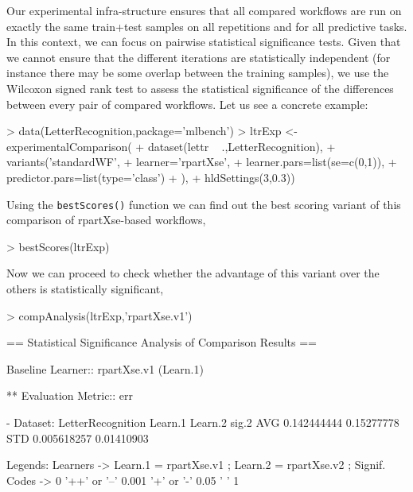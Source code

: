 \documentclass[10pt,a4paper]{article}
\begin{document}
Our experimental infra-structure ensures that all compared workflows
are run on exactly the same train+test samples on all repetitions and
for all predictive tasks. In this context, we can focus on pairwise
statistical significance tests. Given that we cannot ensure that the
different iterations are statistically independent (for instance there
may be some overlap between the training samples), we use the Wilcoxon
signed rank test to assess the statistical significance of the
differences between every pair of compared workflows. Let us see a
concrete example:


\begin{Schunk}
\begin{Sinput}
> data(LetterRecognition,package='mlbench')
> ltrExp <- experimentalComparison(
+   dataset(lettr ~ .,LetterRecognition),
+   variants('standardWF',
+            learner='rpartXse',
+            learner.pars=list(se=c(0,1)),
+            predictor.pars=list(type='class')
+            ),
+   hldSettings(3,0.3))
\end{Sinput}
\end{Schunk}

Using the \texttt{bestScores()} function we can find out the best
scoring variant of this comparison of rpartXse-based workflows,

\begin{Schunk}
\begin{Sinput}
> bestScores(ltrExp)
\end{Sinput}
\end{Schunk}

Now we can proceed to check whether the advantage of this variant over
the others is statistically significant,

\begin{Schunk}
\begin{Sinput}
> compAnalysis(ltrExp,'rpartXse.v1')
\end{Sinput}
\begin{Soutput}
== Statistical Significance Analysis of Comparison Results ==

Baseline Learner::	 rpartXse.v1  (Learn.1)

** Evaluation Metric::	 err 

- Dataset: LetterRecognition 
        Learn.1    Learn.2 sig.2
AVG 0.142444444 0.15277778      
STD 0.005618257 0.01410903      

Legends:
Learners -> Learn.1 = rpartXse.v1 ; Learn.2 = rpartXse.v2 ; 
Signif. Codes -> 0 '++' or '--' 0.001 '+' or '-' 0.05 ' ' 1
\end{Soutput}
\end{Schunk}
\end{document}
